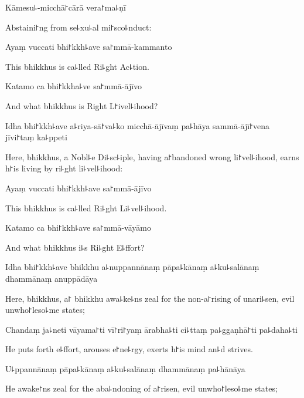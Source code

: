 Kāmesu꜕-micchā꜓cārā vera꜓ma꜕ṇī

\begin{english}
  Abstaini꜓ng from se꜕xu꜕al mi꜓sco꜕nduct:
\end{english}

Ayaṃ vuccati bhi꜓kkh꜕ave sa꜓mmā-kammanto

\begin{english}
  This bhikkhus is ca꜕lled Ri꜕ght Ac꜕tion.
\end{english}

Katamo ca bhi꜓kkha꜕ve sa꜓mmā-ājīvo

\begin{english}
  And what bhikkhus is Right L꜓ivel꜕ihood?
\end{english}

Idha bhi꜓kkh꜕ave a꜕riya-sā꜓va꜕ko micchā-ājīvaṃ pa꜕hāya sammā-ājī꜓vena jīvi꜓taṃ ka꜕ppeti

\begin{english}
  Here, bhikkhus, a Nobl꜕e Di꜕sc꜕iple, having a꜓bandoned wrong li꜓vel꜕ihood, earns h꜓is living by ri꜕ght li꜕vel꜕ihood:
\end{english}

Ayaṃ vuccati bhi꜓kkh꜕ave sa꜓mmā-ājīvo

\begin{english}
  This bhikkhus is ca꜕lled Ri꜕ght Li꜕vel꜕ihood.
\end{english}

Katamo ca bhi꜓kkh꜕ave sa꜓mmā-vāyāmo

\begin{english}
  And what bhikkhus i꜕s Ri꜕ght E꜕ffort?
\end{english}

Idha bhi꜓kkh꜕ave bhikkhu a꜕nuppannānaṃ pāpa꜕kānaṃ a꜕ku꜕salānaṃ dhammānaṃ anuppādāya

\begin{english}
  Here, bhikkhus, a꜓ bhikkhu awa꜕ke꜕ns zeal for the non-a꜓rising of unari꜕sen, evil unwho꜓leso꜕me states;
\end{english}

Chandaṃ ja꜕neti vāyama꜓ti vī꜓ri꜓yaṃ ārabha꜕ti ci꜕ttaṃ pa꜕ggaṇhā꜓ti pa꜕daha꜕ti

\begin{english}
  He puts forth e꜕ffort, arouses e꜓ne꜕rgy, exerts h꜓is mind an꜕d strives.
\end{english}

U꜕ppannānaṃ pāpa꜕kānaṃ a꜕ku꜕salānaṃ dhammānaṃ pa꜕hānāya

\begin{english}
  He awake꜓ns zeal for the aba꜕ndoning of a꜓risen, evil unwho꜓leso꜕me states;
\end{english}

